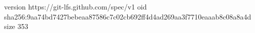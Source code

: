 version https://git-lfs.github.com/spec/v1
oid sha256:9aa74bd7427bebeaa87586c7c02cb692ff4d4ad269aa3f7710eaaab8c08a8a4d
size 353
